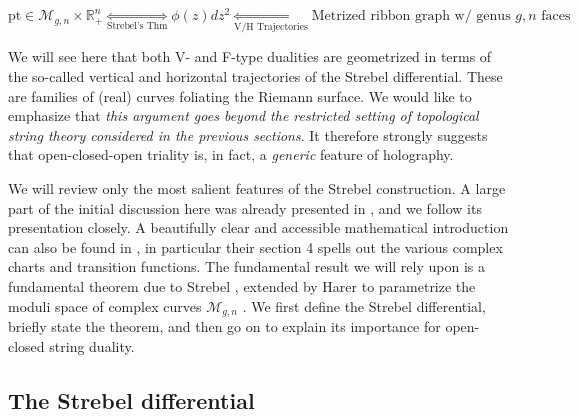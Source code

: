 \documentclass[english]{article}
\let\mc=\mathcal
\let\mb=\mathbb
\begin{document}
\begin{equation*}
    \text{pt} \in \mc{M}_{g,n} \times \mb{R}_{+}^{n} \underset{\text{Strebel's Thm}}{\Longleftrightarrow } \phi(z) dz^2 \underset{\text{V/H Trajectories}}{\Longleftrightarrow} \text{Metrized ribbon graph w/ genus } g, n \text{ faces}
\end{equation*}

We will see here that both V- and F-type dualities are geometrized in terms of the so-called vertical and horizontal trajectories of the Strebel differential. These are families of (real) curves foliating the Riemann surface. We would like to emphasize that \textit{this argument goes beyond the restricted setting of topological string theory considered in the previous sections}. It therefore strongly suggests that open-closed-open triality is, in fact, a \textit{generic} feature of holography. 

We will review only the most salient features of the Strebel construction. A large part of the initial discussion here was already presented in \cite{freefieldsIII}, and we follow its presentation closely. A beautifully clear and accessible mathematical introduction can also be found in \cite{mulaseStrebel}, in particular their section 4 spells out the various complex charts and transition functions. The fundamental result we will rely upon is a fundamental theorem due to Strebel \cite{strebel1984}, extended by Harer to parametrize the moduli space of complex curves $\mc{M}_{g,n}$ \cite{harer1988cohomology}. We first define the Strebel differential, briefly state the theorem, and then go on to explain its importance for open-closed string duality. 

\subsection{The Strebel differential}
\end{document}
